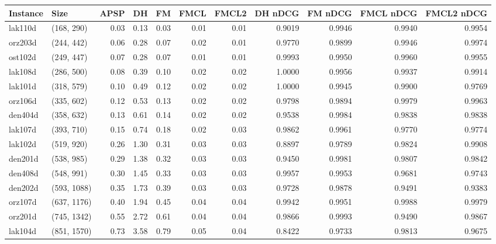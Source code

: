 \begin{tabular}{llrrrrrrrrr}
\toprule
Instance &         Size &  APSP &     DH &    FM &  FMCL &  FMCL2 &  DH nDCG &  FM nDCG &  FMCL nDCG &  FMCL2 nDCG \\
\midrule
 lak110d &   (168, 290) &  0.03 &   0.13 &  0.03 &  0.01 &   0.01 &   0.9019 &   0.9946 &     0.9940 &      0.9954 \\
 orz203d &   (244, 442) &  0.06 &   0.28 &  0.07 &  0.02 &   0.01 &   0.9770 &   0.9899 &     0.9946 &      0.9974 \\
 ost102d &   (249, 447) &  0.07 &   0.28 &  0.07 &  0.01 &   0.01 &   0.9993 &   0.9950 &     0.9960 &      0.9955 \\
 lak108d &   (286, 500) &  0.08 &   0.39 &  0.10 &  0.02 &   0.02 &   1.0000 &   0.9956 &     0.9937 &      0.9914 \\
 lak101d &   (318, 579) &  0.10 &   0.49 &  0.12 &  0.02 &   0.02 &   1.0000 &   0.9945 &     0.9900 &      0.9769 \\
 orz106d &   (335, 602) &  0.12 &   0.53 &  0.13 &  0.02 &   0.02 &   0.9798 &   0.9894 &     0.9979 &      0.9963 \\
 den404d &   (358, 632) &  0.13 &   0.61 &  0.14 &  0.02 &   0.02 &   0.9538 &   0.9984 &     0.9838 &      0.9838 \\
 lak107d &   (393, 710) &  0.15 &   0.74 &  0.18 &  0.02 &   0.03 &   0.9862 &   0.9961 &     0.9770 &      0.9774 \\
 lak102d &   (519, 920) &  0.26 &   1.30 &  0.31 &  0.03 &   0.03 &   0.8897 &   0.9789 &     0.9824 &      0.9908 \\
 den201d &   (538, 985) &  0.29 &   1.38 &  0.32 &  0.03 &   0.03 &   0.9450 &   0.9981 &     0.9807 &      0.9842 \\
 den408d &   (548, 991) &  0.30 &   1.45 &  0.33 &  0.03 &   0.03 &   0.9957 &   0.9953 &     0.9681 &      0.9743 \\
 den202d &  (593, 1088) &  0.35 &   1.73 &  0.39 &  0.03 &   0.03 &   0.9728 &   0.9878 &     0.9491 &      0.9383 \\
 orz107d &  (637, 1176) &  0.40 &   1.94 &  0.45 &  0.04 &   0.04 &   0.9942 &   0.9951 &     0.9988 &      0.9979 \\
 orz201d &  (745, 1342) &  0.55 &   2.72 &  0.61 &  0.04 &   0.04 &   0.9866 &   0.9993 &     0.9490 &      0.9867 \\
 lak104d &  (851, 1570) &  0.73 &   3.58 &  0.79 &  0.05 &   0.04 &   0.8422 &   0.9733 &     0.9813 &      0.9675 \\

\end{tabular}
